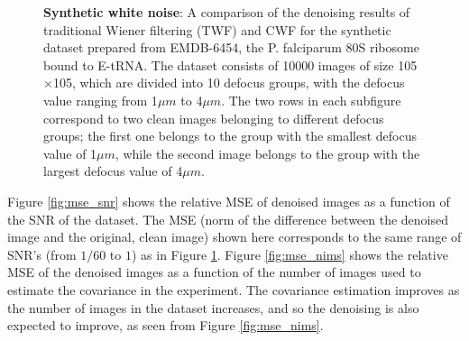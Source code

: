 \documentclass[review]{elsarticle}
\begin{document}
\begin{figure}[]
\centering
{}
\vspace{-1mm}
\vspace{-1mm}
\vspace{-3mm}
\caption{\textbf{Synthetic white noise}: A comparison of the denoising results of 
traditional Wiener filtering (TWF) and CWF for the 
synthetic dataset prepared from EMDB-6454, the P. falciparum 80S ribosome bound 
to E-tRNA. The dataset consists of 10000 images
of size 105$\times$105, which are divided into 10 defocus groups, with the 
defocus value ranging from 1$\mu m$ to 4$\mu m$. The two rows in each subfigure 
correspond to two clean
images belonging to different defocus groups;
the first one
belongs to the group with the smallest defocus value of 1$\mu m$, 
while the second image belongs to the group with the
largest defocus value of 4$\mu m$.  
}
\label{fig:ims_6454}
\end{figure}

Figure \ref{fig:mse_snr} shows the relative MSE of denoised images as a function
of the SNR of the dataset. The MSE (norm of the difference between the denoised image and the original, clean image) shown here
corresponds to the same range of SNR's (from $1/60$ to $1$) as in Figure 
\ref{fig:ims_6454}. Figure \ref{fig:mse_nims} shows the relative MSE of the 
denoised images as a 
function of the number of images used to estimate the covariance in the experiment.
The covariance estimation improves as the number of images in the 
dataset increases, and so the denoising is also expected
to improve, as seen from Figure \ref{fig:mse_nims}.
\end{document}

